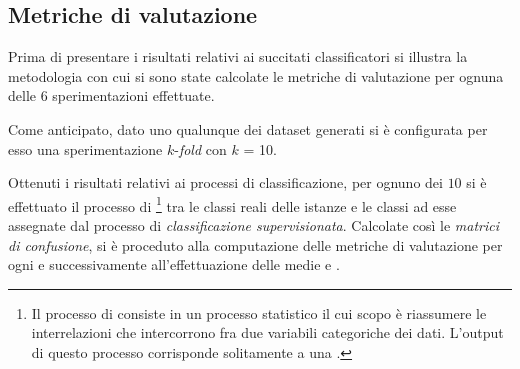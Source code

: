 \subsection{Metriche di valutazione}
Prima di presentare i risultati relativi ai succitati classificatori si illustra la metodologia con cui si sono state calcolate le metriche di valutazione per ognuna delle $6$ sperimentazioni effettuate.

Come anticipato, dato uno qualunque dei dataset generati si è configurata per esso una sperimentazione $k$-\emph{fold } con $k$ = 10.

Ottenuti i risultati relativi ai processi di classificazione, per ognuno dei $10$ \emph{} si è effettuato il processo di \emph{}\footnote{Il processo di  consiste in un processo statistico il cui scopo è riassumere le interrelazioni che intercorrono fra due variabili categoriche dei dati. L'output di questo processo corrisponde solitamente a una \emph{}.} tra le classi reali delle istanze e le classi ad esse assegnate dal processo di \emph{classificazione supervisionata}. Calcolate così le \emph{matrici di confusione}, si è proceduto alla computazione delle metriche di valutazione per ogni \emph{} e successivamente all'effettuazione delle medie \emph{} e \emph{}.

